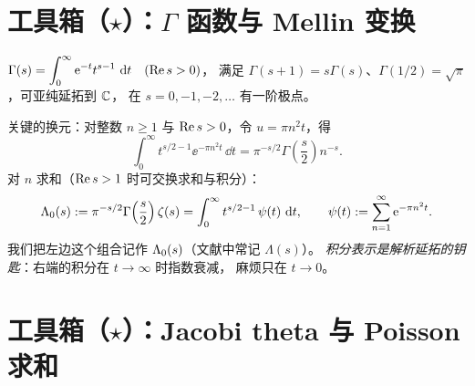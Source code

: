 \begin{center}
\end{center}

\section{工具箱（$\star$）：$\Gamma$ 函数与 Mellin 变换}
\label{sec:02-tools}

\begin{definition}[Gamma 函数]
$\displaystyle\Gamma(s)=\int_0^\infty \mathrm{e}^{-t}t^{s-1}\,\mathop{}\!\mathrm{d} t\quad(\operatorname{Re} s>0)$，
满足 $\Gamma(s+1)=s\Gamma(s)$、$\Gamma(1/2)=\sqrt\pi$，可亚纯延拓到 $\mathbb{C}$，
在 $s=0,-1,-2,\dots$ 有一阶极点。
\end{definition}

关键的换元：对整数 $n\ge1$ 与 $\operatorname{Re} s>0$，令 $u=\pi n^2 t$，得
\begin{equation}\label{eq:02-mellin}
  \int_0^\infty t^{s/2-1}\ee^{-\pi n^2 t}\,\dd t
  =\pi^{-s/2}\Gamma\!\left(\frac s2\right)n^{-s}.
\end{equation}
对 $n$ 求和（$\operatorname{Re} s>1$ 时可交换求和与积分）：
\begin{equation}\label{eq:02-Lambda}
  \Lambda_0(s):=\pi^{-s/2}\Gamma\!\left(\frac s2\right)\zeta(s)
  =\int_0^\infty t^{s/2-1}\,\psi(t)\,\mathop{}\!\mathrm{d} t,
  \qquad
  \psi(t):=\sum_{n=1}^{\infty}\mathrm{e}^{-\pi n^2 t}.
\end{equation}
我们把左边这个组合记作 $\Lambda_0(s)$（文献中常记 $\Lambda(s)$）。
\emph{积分表示是解析延拓的钥匙}：右端的积分在 $t\to\infty$ 时指数衰减，
麻烦只在 $t\to0$。

\section{工具箱（$\star$）：Jacobi theta 与 Poisson 求和}
\label{sec:02-theta}

